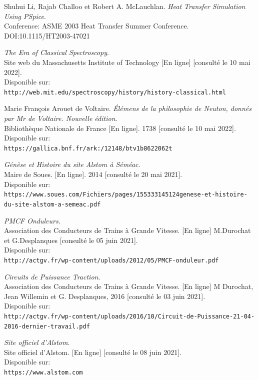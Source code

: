 \documentclass[a4paper]{report}
\begin{document}
	\begin{thebibliography}{9}
		
		
		Shuhui Li, Rajab Challoo et Robert A. McLauchlan. 
		\textit{Heat Transfer Simulation Using PSpice}.\\ 
		Conference: ASME 2003 Heat Transfer Summer Conference.\\
		DOI:10.1115/HT2003-47021
		
		\textit{The Era of Classical Spectroscopy}.\\ 
		Site web du Massachusetts Institute of Technology [En ligne] [consulté le 10 mai 2022].\\
		Disponible sur: \\\texttt{http://web.mit.edu/spectroscopy/history/history-classical.html}		
		
		Marie François Arouet de Voltaire. 
		\textit{Élémens de la philosophie de Neuton, donnés par Mr de Voltaire. Nouvelle édition}.\\ 
		Bibliothèque Nationale de France [En ligne]. 1738 [consulté le 10 mai 2022].\\
		Disponible sur: \\\texttt{https://gallica.bnf.fr/ark:/12148/btv1b8622062t}
		
		\textit{Génèse et Histoire du site Alstom à Séméac}.\\
		Maire de Soues. [En ligne]. 2014 [consulté le 20 mai 2021].\\
		Disponible sur: \\\texttt{https://www.soues.com/Fichiers/pages/155333145124genese-et-histoire-du-site-alstom-a-semeac.pdf}
		
		\textit{PMCF Onduleurs}.\\
		Association des Conducteurs de Trains à Grande Vitesse. [En ligne] M.Durochat et G.Desplanques [consulté le 05 juin 2021].\\
		Disponible sur: \\\texttt{http://actgv.fr/wp-content/uploads/2012/05/PMCF-onduleur.pdf}
		
		\textit{Circuits de Puissance Traction}.\\
		Association des Conducteurs de Trains à Grande Vitesse. [En ligne] M Durochat, Jean Willemin et G. Desplanques, 2016 [consulté le 03 juin 2021].\\
		Disponible sur: \\\texttt{http://actgv.fr/wp-content/uploads/2016/10/Circuit-de-Puissance-21-04-2016-dernier-travail.pdf}
		
		\textit{Site officiel d'Alstom}.\\
		Site officiel d'Alstom. [En ligne] [consulté le 08 juin 2021].\\
		Disponible sur: \\\texttt{https://www.alstom.com}
		
	\end{thebibliography}
	
	
\end{document}
